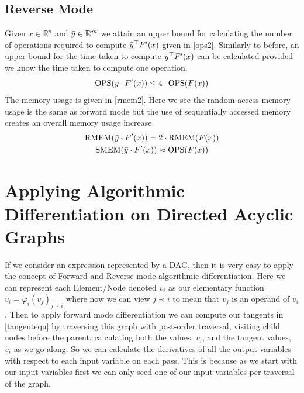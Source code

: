 \documentclass{article}
\begin{document}
\subsection{Reverse Mode}

Given $x \in \mathbb{R}^n$ and $\Bar{y} \in \mathbb{R}^m$ we attain an upper bound for calculating the number of operations required to compute $\Bar{y}^\top F'(x)$ given in \eqref{ops2}. Similarly to before, an upper bound for the time taken to compute $\Bar{y}^\top F'(x)$ can be calculated provided we know the time taken to compute one operation.
\begin{equation} \label{ops2}
    \text{OPS}(\Bar{y} \cdot F'(x)) \leq 4 \cdot \text{OPS}(F(x))
\end{equation}
The memory usage is given in \eqref{rmem2}. Here we see the random access memory usage is the same as forward mode but the use of sequentially accessed memory creates an overall memory usage increase.
\begin{equation} \label{rmem2}
    \begin{gathered}
        \text{RMEM}(\Bar{y} \cdot F'(x)) = 2 \cdot \text{RMEM}(F(x)) \\ 
        \text{SMEM}(\Bar{y} \cdot F'(x)) \approx \text{OPS}(F(x))
    \end{gathered}
\end{equation}

\section{Applying Algorithmic Differentiation on Directed Acyclic Graphs}

If we consider an expression represented by a DAG, then it is very easy to apply the concept of Forward and Reverse mode algorithmic differentiation. Here we can represent each Element/Node denoted $v_i$ as our elementary function $v_i = \varphi_i (v_j)_{j \prec i}$ where now we can view $j \prec i$ to mean that $v_j$ is an operand of $v_i$. Then to apply forward mode differentiation we can compute our tangents in \eqref{tangentequ} by traversing this graph with post-order traversal, visiting child nodes before the parent, calculating both the values, $v_i$, and the tangent values, $\Dot{v_i}$ as we go along. So we can calculate the derivatives of all the output variables with respect to each input variable on each pass. This is because as we start with our input variables first we can only seed one of our input variables per traversal of the graph.
\end{document}
